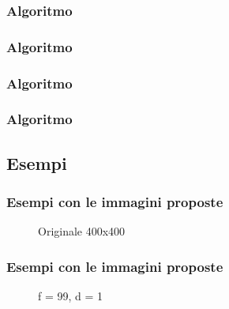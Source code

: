 \documentclass{beamer}
\begin{document}
\begin{frame}
	\frametitle{Algoritmo}

\end{frame}

\begin{frame}
	\frametitle{Algoritmo}
	
\end{frame}

\begin{frame}
	\frametitle{Algoritmo}
	
\end{frame}

\begin{frame}
	\frametitle{Algoritmo}
	
\end{frame}

\subsection{Esempi}

\begin{frame}
\frametitle{Esempi con le immagini proposte}
\begin{figure}
		\caption{Originale 400x400}
\end{figure}

\end{frame}

\begin{frame}
	\frametitle{Esempi con le immagini proposte}
	\begin{figure}
		\caption{f = 99, d = 1}
	\end{figure}

\end{frame}
\end{document}
